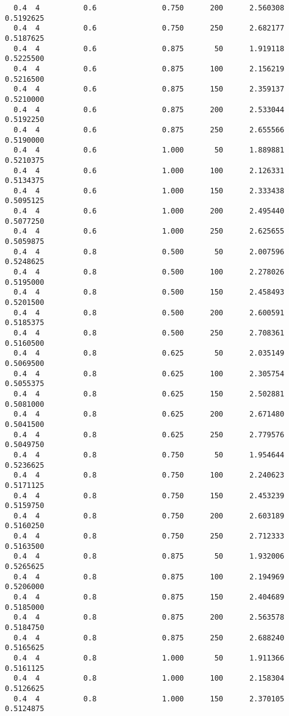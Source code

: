 \documentclass[
  letterpaper,
  DIV=11,
  numbers=noendperiod]{scrartcl}
\begin{document}
\begin{verbatim}
  0.4  4          0.6               0.750      200      2.560308  0.5192625
  0.4  4          0.6               0.750      250      2.682177  0.5187625
  0.4  4          0.6               0.875       50      1.919118  0.5225500
  0.4  4          0.6               0.875      100      2.156219  0.5216500
  0.4  4          0.6               0.875      150      2.359137  0.5210000
  0.4  4          0.6               0.875      200      2.533044  0.5192250
  0.4  4          0.6               0.875      250      2.655566  0.5190000
  0.4  4          0.6               1.000       50      1.889881  0.5210375
  0.4  4          0.6               1.000      100      2.126331  0.5134375
  0.4  4          0.6               1.000      150      2.333438  0.5095125
  0.4  4          0.6               1.000      200      2.495440  0.5077250
  0.4  4          0.6               1.000      250      2.625655  0.5059875
  0.4  4          0.8               0.500       50      2.007596  0.5248625
  0.4  4          0.8               0.500      100      2.278026  0.5195000
  0.4  4          0.8               0.500      150      2.458493  0.5201500
  0.4  4          0.8               0.500      200      2.600591  0.5185375
  0.4  4          0.8               0.500      250      2.708361  0.5160500
  0.4  4          0.8               0.625       50      2.035149  0.5069500
  0.4  4          0.8               0.625      100      2.305754  0.5055375
  0.4  4          0.8               0.625      150      2.502881  0.5081000
  0.4  4          0.8               0.625      200      2.671480  0.5041500
  0.4  4          0.8               0.625      250      2.779576  0.5049750
  0.4  4          0.8               0.750       50      1.954644  0.5236625
  0.4  4          0.8               0.750      100      2.240623  0.5171125
  0.4  4          0.8               0.750      150      2.453239  0.5159750
  0.4  4          0.8               0.750      200      2.603189  0.5160250
  0.4  4          0.8               0.750      250      2.712333  0.5163500
  0.4  4          0.8               0.875       50      1.932006  0.5265625
  0.4  4          0.8               0.875      100      2.194969  0.5206000
  0.4  4          0.8               0.875      150      2.404689  0.5185000
  0.4  4          0.8               0.875      200      2.563578  0.5184750
  0.4  4          0.8               0.875      250      2.688240  0.5165625
  0.4  4          0.8               1.000       50      1.911366  0.5161125
  0.4  4          0.8               1.000      100      2.158304  0.5126625
  0.4  4          0.8               1.000      150      2.370105  0.5124875

\end{verbatim}
\end{document}
